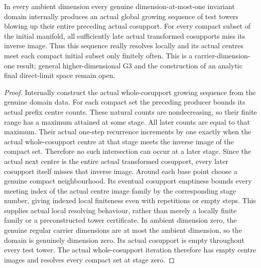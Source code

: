 \begin{theorem}
\label{hir:curve-global-locally-resolving-sequence}
\leanok
In every ambient dimension every genuine dimension-at-most-one invariant
domain internally produces an actual global growing sequence of test towers
blowing up their entire preceding actual cosupport. For every compact subset
of the initial manifold, all sufficiently late actual transformed cosupports
miss its inverse image. Thus this sequence really resolves locally and its
actual centres meet each compact initial subset only finitely often.
This is a carrier-dimension-one result; general higher-dimensional G3 and the
construction of an analytic final direct-limit space remain open.
\end{theorem}
\begin{proof}
Internally construct the actual whole-cosupport growing sequence from the
genuine domain data. For each compact set the preceding producer bounds
its actual prefix centre counts. These natural counts are nondecreasing,
so their finite range has a maximum attained at some stage. All later counts
are equal to that maximum. Their actual one-step recurrence increments by
one exactly when the actual whole-cosupport centre at that stage meets
the inverse image of the compact set. Therefore no such intersection can
occur at a later stage. Since the actual next centre is the entire actual
transformed cosupport, every later cosupport itself misses that inverse
image. Around each base point choose a genuine compact neighbourhood. Its
eventual cosupport emptiness bounds every meeting index of the actual centre
image family by the corresponding stage number, giving indexed local
finiteness even with repetitions or empty steps. This supplies actual local resolving behaviour, rather than merely
a locally finite family or a preconstructed tower certificate. In ambient
dimension zero, the genuine regular carrier dimensions are at most the ambient
dimension, so the domain is genuinely dimension zero. Its actual cosupport
is empty throughout every test tower. The actual whole-cosupport iteration
therefore has empty centre images and resolves every compact set at stage zero.
\end{proof}

